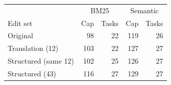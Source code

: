 \begin{tabular}{lrrrr}\toprule
& \multicolumn{2}{c}{BM25} & \multicolumn{2}{c}{Semantic}\\
Edit set & Cap & Tasks & Cap & Tasks\\\midrule
Original & 98 & 22 & 119 & 26 \\
Translation (12) & 103 & 22 & 127 & 27 \\
Structured (same 12) & 102 & 25 & 126 & 27 \\
Structured (43) & 116 & 27 & 129 & 27 \\
\bottomrule\end{tabular}

